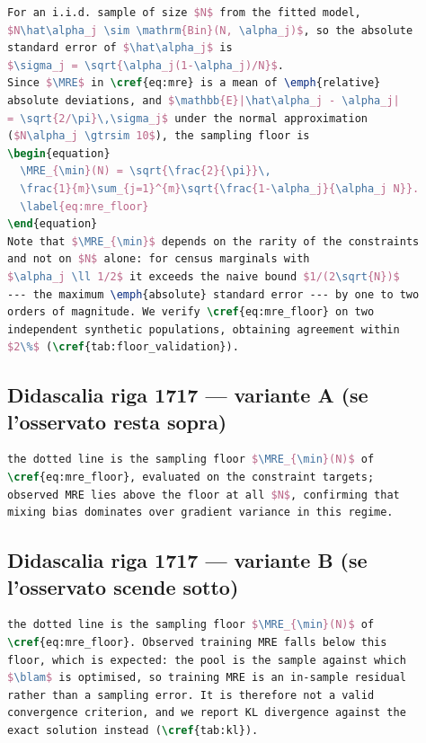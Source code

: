 \documentclass[11pt,a4paper]{article}
\newcommand{\MRE}{\mathrm{MRE}}
\begin{document}
\begin{lstlisting}[language=TeX]
For an i.i.d. sample of size $N$ from the fitted model,
$N\hat\alpha_j \sim \mathrm{Bin}(N, \alpha_j)$, so the absolute
standard error of $\hat\alpha_j$ is
$\sigma_j = \sqrt{\alpha_j(1-\alpha_j)/N}$.
Since $\MRE$ in \cref{eq:mre} is a mean of \emph{relative}
absolute deviations, and $\mathbb{E}|\hat\alpha_j - \alpha_j|
= \sqrt{2/\pi}\,\sigma_j$ under the normal approximation
($N\alpha_j \gtrsim 10$), the sampling floor is
\begin{equation}
  \MRE_{\min}(N) = \sqrt{\frac{2}{\pi}}\,
  \frac{1}{m}\sum_{j=1}^{m}\sqrt{\frac{1-\alpha_j}{\alpha_j N}}.
  \label{eq:mre_floor}
\end{equation}
Note that $\MRE_{\min}$ depends on the rarity of the constraints
and not on $N$ alone: for census marginals with
$\alpha_j \ll 1/2$ it exceeds the naive bound $1/(2\sqrt{N})$
--- the maximum \emph{absolute} standard error --- by one to two
orders of magnitude. We verify \cref{eq:mre_floor} on two
independent synthetic populations, obtaining agreement within
$2\%$ (\cref{tab:floor_validation}).
\end{lstlisting}

\subsection*{Didascalia riga 1717 --- variante A (se l'osservato resta sopra)}

\begin{lstlisting}[language=TeX]
the dotted line is the sampling floor $\MRE_{\min}(N)$ of
\cref{eq:mre_floor}, evaluated on the constraint targets;
observed MRE lies above the floor at all $N$, confirming that
mixing bias dominates over gradient variance in this regime.
\end{lstlisting}

\subsection*{Didascalia riga 1717 --- variante B (se l'osservato scende sotto)}

\begin{lstlisting}[language=TeX]
the dotted line is the sampling floor $\MRE_{\min}(N)$ of
\cref{eq:mre_floor}. Observed training MRE falls below this
floor, which is expected: the pool is the sample against which
$\blam$ is optimised, so training MRE is an in-sample residual
rather than a sampling error. It is therefore not a valid
convergence criterion, and we report KL divergence against the
exact solution instead (\cref{tab:kl}).
\end{lstlisting}
\end{document}
